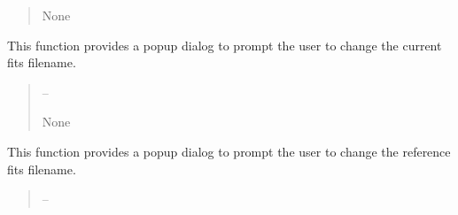 \documentclass[letterpaper,11pt,english]{sphinxmanual}
\begin{document}
\begin{savenotes}
\begin{fulllineitems}
\begin{savenotes}
\begin{fulllineitems}
\begin{quote}
\begin{description}
\sphinxAtStartPar
None

\end{description}\end{quote}

\end{fulllineitems}\end{savenotes}


\begin{savenotes}\begin{fulllineitems}
\label{\detokenize{code/opihiexarata.gui.selector:opihiexarata.gui.selector.TargetSelectorWindow.__connect_push_button_change_current_filename}}
\pysigstartsignatures
{}
\pysigstopsignatures
\sphinxAtStartPar
This function provides a popup dialog to prompt the user to change
the current fits filename.
\begin{quote}\begin{description}
\sphinxAtStartPar
{} – 

\sphinxAtStartPar
None

\end{description}\end{quote}

\end{fulllineitems}\end{savenotes}


\begin{savenotes}\begin{fulllineitems}
\label{\detokenize{code/opihiexarata.gui.selector:opihiexarata.gui.selector.TargetSelectorWindow.__connect_push_button_change_reference_filename}}
\pysigstartsignatures
{}
\pysigstopsignatures
\sphinxAtStartPar
This function provides a popup dialog to prompt the user to change
the reference fits filename.
\begin{quote}\begin{description}
\sphinxAtStartPar
{} – 


\end{description}
\end{quote}
\end{fulllineitems}
\end{savenotes}
\end{fulllineitems}
\end{savenotes}
\end{document}
